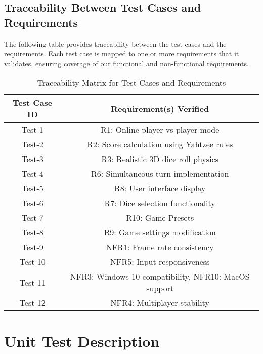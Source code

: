 \documentclass[12pt, titlepage]{article}
\begin{document}
\subsection{Traceability Between Test Cases and Requirements}

The following table provides traceability between the test cases and the requirements. Each test case is mapped to one or more requirements that it validates, ensuring coverage of our functional and non-functional requirements.

\begin{table}[H]
    \centering
    \caption{Traceability Matrix for Test Cases and Requirements}
    \begin{tabular}{|c|c|}
        \hline
        \textbf{Test Case ID} & \textbf{Requirement(s) Verified} \\
        \hline
        Test-1 & R1: Online player vs player mode \\
        Test-2 & R2: Score calculation using Yahtzee rules \\
        Test-3 & R3: Realistic 3D dice roll physics \\
        Test-4 & R6: Simultaneous turn implementation \\
        Test-5 & R8: User interface display \\
        Test-6 & R7: Dice selection functionality \\
        Test-7 & R10: Game Presets \\
        Test-8 & R9: Game settings modification \\
        Test-9 & NFR1: Frame rate consistency \\
        Test-10 & NFR5: Input responsiveness \\
        Test-11 & NFR3: Windows 10 compatibility, NFR10: MacOS support \\
        Test-12 & NFR4: Multiplayer stability \\
        \hline
    \end{tabular}
    \label{tab:traceability}
\end{table}


\section{Unit Test Description}


\end{document}
